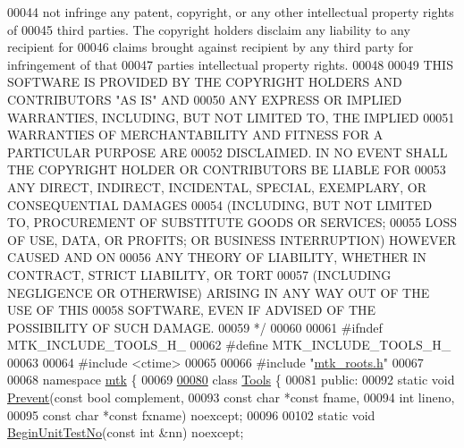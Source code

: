 \begin{DoxyCode}
00044 \textcolor{comment}{not infringe any patent, copyright, or any other intellectual property rights of}
00045 \textcolor{comment}{third parties. The copyright holders disclaim any liability to any recipient for}
00046 \textcolor{comment}{claims brought against recipient by any third party for infringement of that}
00047 \textcolor{comment}{parties intellectual property rights.}
00048 \textcolor{comment}{}
00049 \textcolor{comment}{THIS SOFTWARE IS PROVIDED BY THE COPYRIGHT HOLDERS AND CONTRIBUTORS "AS IS" AND}
00050 \textcolor{comment}{ANY EXPRESS OR IMPLIED WARRANTIES, INCLUDING, BUT NOT LIMITED TO, THE IMPLIED}
00051 \textcolor{comment}{WARRANTIES OF MERCHANTABILITY AND FITNESS FOR A PARTICULAR PURPOSE ARE}
00052 \textcolor{comment}{DISCLAIMED. IN NO EVENT SHALL THE COPYRIGHT HOLDER OR CONTRIBUTORS BE LIABLE FOR}
00053 \textcolor{comment}{ANY DIRECT, INDIRECT, INCIDENTAL, SPECIAL, EXEMPLARY, OR CONSEQUENTIAL DAMAGES}
00054 \textcolor{comment}{(INCLUDING, BUT NOT LIMITED TO, PROCUREMENT OF SUBSTITUTE GOODS OR SERVICES;}
00055 \textcolor{comment}{LOSS OF USE, DATA, OR PROFITS; OR BUSINESS INTERRUPTION) HOWEVER CAUSED AND ON}
00056 \textcolor{comment}{ANY THEORY OF LIABILITY, WHETHER IN CONTRACT, STRICT LIABILITY, OR TORT}
00057 \textcolor{comment}{(INCLUDING NEGLIGENCE OR OTHERWISE) ARISING IN ANY WAY OUT OF THE USE OF THIS}
00058 \textcolor{comment}{SOFTWARE, EVEN IF ADVISED OF THE POSSIBILITY OF SUCH DAMAGE.}
00059 \textcolor{comment}{*/}
00060 
00061 \textcolor{preprocessor}{#ifndef MTK\_INCLUDE\_TOOLS\_H\_}
00062 \textcolor{preprocessor}{#define MTK\_INCLUDE\_TOOLS\_H\_}
00063 
00064 \textcolor{preprocessor}{#include <ctime>}
00065 
00066 \textcolor{preprocessor}{#include "\hyperlink{mtk__roots_8h}{mtk\_roots.h}"}
00067 
00068 \textcolor{keyword}{namespace }\hyperlink{namespacemtk}{mtk} \{
00069 
\hypertarget{mtk__tools_8h_source_l00080}{}\hyperlink{classmtk_1_1Tools}{00080} \textcolor{keyword}{class }\hyperlink{classmtk_1_1Tools}{Tools} \{
00081  \textcolor{keyword}{public}:
00092   \textcolor{keyword}{static} \textcolor{keywordtype}{void} \hyperlink{classmtk_1_1Tools_a332324c6f25e66be9dff48c5987a3b9f}{Prevent}(\textcolor{keyword}{const} \textcolor{keywordtype}{bool} complement,
00093                       \textcolor{keyword}{const} \textcolor{keywordtype}{char} *\textcolor{keyword}{const} fname,
00094                       \textcolor{keywordtype}{int} lineno,
00095                       \textcolor{keyword}{const} \textcolor{keywordtype}{char} *\textcolor{keyword}{const} fxname) noexcept;
00096 
00102   \textcolor{keyword}{static} \textcolor{keywordtype}{void} \hyperlink{classmtk_1_1Tools_afc29ecaf337a13ed2e817d3890a5a441}{BeginUnitTestNo}(\textcolor{keyword}{const} \textcolor{keywordtype}{int} &nn) noexcept;

\end{DoxyCode}
